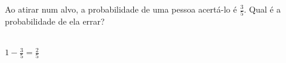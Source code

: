 \begin{ex}
Ao atirar num alvo, a probabilidade de uma pessoa acertá-lo é $\frac{3}{5}$. Qual é a probabilidade de ela errar?
 \begin{sol}
   \phantom{A} \\
   $1-\frac{3}{5}=\frac{2}{5}$
 \end{sol}
\end{ex}